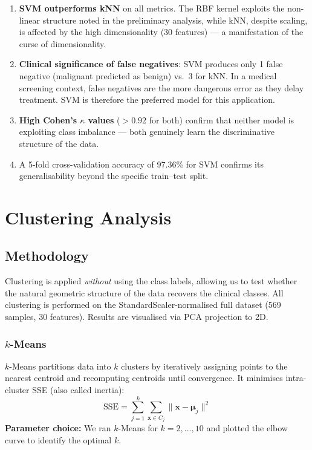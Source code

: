 \documentclass[12pt,a4paper]{article}
\begin{document}
\begin{enumerate}[leftmargin=2em]
  \item \textbf{SVM outperforms kNN} on all metrics.  The RBF kernel exploits the
        non-linear structure noted in the preliminary analysis, while kNN, despite
        scaling, is affected by the high dimensionality (30 features) --- a manifestation
        of the curse of dimensionality.
  \item \textbf{Clinical significance of false negatives}: SVM produces only 1
        false negative (malignant predicted as benign) vs.\ 3 for kNN.  In a medical
        screening context, false negatives are the more dangerous error as they
        delay treatment.  SVM is therefore the preferred model for this application.
  \item \textbf{High Cohen's $\kappa$ values} ($>0.92$ for both) confirm that neither
        model is exploiting class imbalance --- both genuinely learn the discriminative
        structure of the data.
  \item A 5-fold cross-validation accuracy of 97.36\% for SVM confirms its
        generalisability beyond the specific train--test split.
\end{enumerate}

\section{Clustering Analysis}

\subsection{Methodology}

Clustering is applied \emph{without} using the class labels, allowing us to test
whether the natural geometric structure of the data recovers the clinical classes.
All clustering is performed on the StandardScaler-normalised full dataset
(569 samples, 30 features).  Results are visualised via PCA projection to 2D.

\subsubsection{$k$-Means}
$k$-Means partitions data into $k$ clusters by iteratively assigning points to the
nearest centroid and recomputing centroids until convergence.  It minimises intra-cluster
SSE (also called inertia):
\[
  \text{SSE} = \sum_{j=1}^{k} \sum_{\mathbf{x} \in C_j} \|\mathbf{x} - \boldsymbol{\mu}_j\|^2
\]
\textbf{Parameter choice:} We ran $k$-Means for $k = 2,\ldots,10$ and plotted the
elbow curve to identify the optimal $k$.
\end{document}
